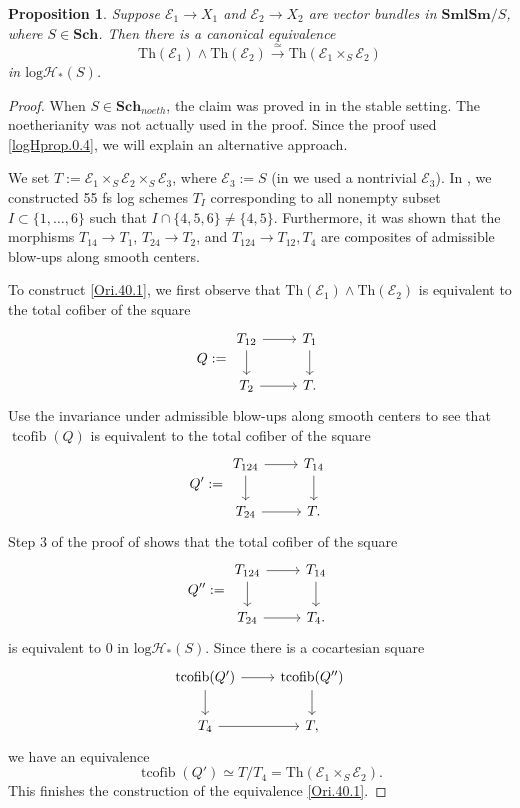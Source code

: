 \documentclass[11pt, a4paper]{amsart}
\newtheorem{prop}[thm]{Proposition}
\theoremstyle{definition}
\numberwithin{equation}{subsection}
\newcommand{\Sch}{\mathbf{Sch}}
\newcommand{\SmlSm}{\mathbf{SmlSm}}
\newcommand{\Thom}{\mathrm{Th}}
\newcommand{\cE}{\mathcal{E}}
\newcommand{\tcofib}{\operatorname{tcofib}}
\newcommand{\inflogHpt}{\mathrm{log}\mathcal{H}_\ast}
\begin{document}
\begin{prop}
\label{Ori.40}
Suppose $\cE_1 \to X_1$ and $\cE_2\to X_2$ are vector bundles in $\SmlSm/S$, where $S\in \Sch$.
Then there is a canonical equivalence
\begin{equation}
\label{Ori.40.1}
\Thom(\cE_1)\wedge \Thom(\cE_2)
\xrightarrow{\simeq}
\Thom(\cE_1\times_S \cE_2)
\end{equation}
in $\inflogHpt(S)$.
\end{prop}
\begin{proof}
When $S\in \Sch_{noeth}$, the claim
was proved in \cite[Proposition 7.4.15]{logDM} in the stable setting. The noetherianity was not actually used in the proof. 
Since the proof used \eqref{logHprop.0.4}, we will explain an alternative approach.

We set $T:=\cE_1\times_S \cE_2\times_S \cE_3$, where $\cE_3:=S$
(in \cite[Proposition 7.4.16]{logDM} we used a nontrivial $\cE_3$).
In \cite[Construction 7.4.14]{logDM}, 
we constructed 55 fs log schemes $T_I$ corresponding to all nonempty subset $I\subset\{1,\ldots,6\}$ such that 
$I\cap \{4,5,6\}\neq \{4,5\}$.
Furthermore, 
it was shown that the morphisms $T_{14}\to T_1$, $T_{24}\to T_2$, and $T_{124}\to T_{12},T_4$ 
are composites of admissible blow-ups along smooth centers.

To construct \eqref{Ori.40.1}, 
we first observe that $\Thom(\cE_1)\wedge \Thom(\cE_2)$ is equivalent to the total cofiber of the square
\[
Q
:=
\begin{tikzcd}
T_{12}\ar[d]\ar[r]&
T_1 \ar[d]
\\
T_2\ar[r]&
T.
\end{tikzcd}
\]
Use the invariance under admissible blow-ups along smooth centers to see that $\tcofib(Q)$ is equivalent 
to the total cofiber of the square
\[
Q'
:=
\begin{tikzcd}
T_{124}\ar[d]\ar[r]&
T_{14} \ar[d]
\\
T_{24}\ar[r]&
T.
\end{tikzcd}
\]
Step 3 of the proof of \cite[Proposition 7.4.15]{logDM} shows that the total cofiber of the square
\[
Q''
:=
\begin{tikzcd}
T_{124}\ar[d]\ar[r]&
T_{14}\ar[d]
\\
T_{24}\ar[r]&
T_4.
\end{tikzcd}
\]
is equivalent to $0$ in $\inflogHpt(S)$.
Since there is a cocartesian square
\[
\begin{tikzcd}
\tcofib(Q')\ar[d]\ar[r]&
\tcofib(Q'')\ar[d]
\\
T_4\ar[r]&
T,
\end{tikzcd}
\]
we have an equivalence
\[
\tcofib(Q')
\simeq
T/T_4
=
\Thom(\cE_1\times_S \cE_2).
\]
This finishes the construction of the equivalence \eqref{Ori.40.1}.
\end{proof}
\end{document}
